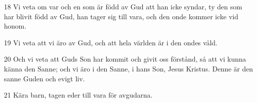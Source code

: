 \par 18 Vi veta om var och en som är född av Gud att han icke syndar, ty den som har blivit född av Gud, han tager sig till vara, och den onde kommer icke vid honom.
\par 19 Vi veta att vi äro av Gud, och att hela världen är i den ondes våld.
\par 20 Och vi veta att Guds Son har kommit och givit oss förstånd, så att vi kunna känna den Sanne; och vi äro i den Sanne, i hans Son, Jesus Kristus. Denne är den sanne Guden och evigt liv.
\par 21 Kära barn, tagen eder till vara för avgudarna.


